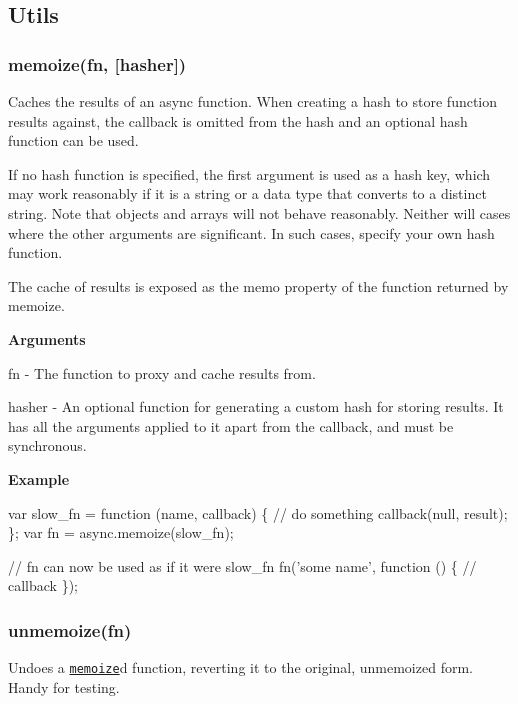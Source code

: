 \subsection*{Utils}

\label{_memoize}%
 \subsubsection*{memoize(fn, \mbox{[}hasher\mbox{]})}

Caches the results of an {\ttfamily async} function. When creating a hash to store function results against, the callback is omitted from the hash and an optional hash function can be used.

If no hash function is specified, the first argument is used as a hash key, which may work reasonably if it is a string or a data type that converts to a distinct string. Note that objects and arrays will not behave reasonably. Neither will cases where the other arguments are significant. In such cases, specify your own hash function.

The cache of results is exposed as the {\ttfamily memo} property of the function returned by {\ttfamily memoize}.

{\bfseries Arguments}


\begin{DoxyItemize}
\item {\ttfamily fn} -\/ The function to proxy and cache results from.
\item {\ttfamily hasher} -\/ An optional function for generating a custom hash for storing results. It has all the arguments applied to it apart from the callback, and must be synchronous.
\end{DoxyItemize}

{\bfseries Example}


\begin{DoxyCode}
var slow\_fn = function (name, callback) \{
    // do something
    callback(null, result);
\};
var fn = async.memoize(slow\_fn);

// fn can now be used as if it were slow\_fn
fn('some name', function () \{
    // callback
\});
\end{DoxyCode}


\label{_unmemoize}%
 \subsubsection*{unmemoize(fn)}

Undoes a \href{#memoize}{\tt {\ttfamily memoize}}d function, reverting it to the original, unmemoized form. Handy for testing.

